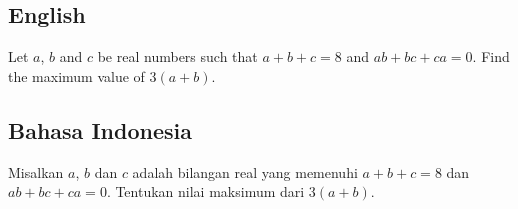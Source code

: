 \subsection*{English}
Let $a$, $b$ and $c$ be real numbers such that $a + b + c = 8$ and $ab + bc + ca = 0$.
Find the maximum value of $3(a + b)$.

\subsection*{Bahasa Indonesia}
Misalkan $a$, $b$ dan $c$ adalah bilangan real yang memenuhi $a + b + c = 8$ dan $ab + bc + ca = 0$.
Tentukan nilai maksimum dari $3(a + b)$.

